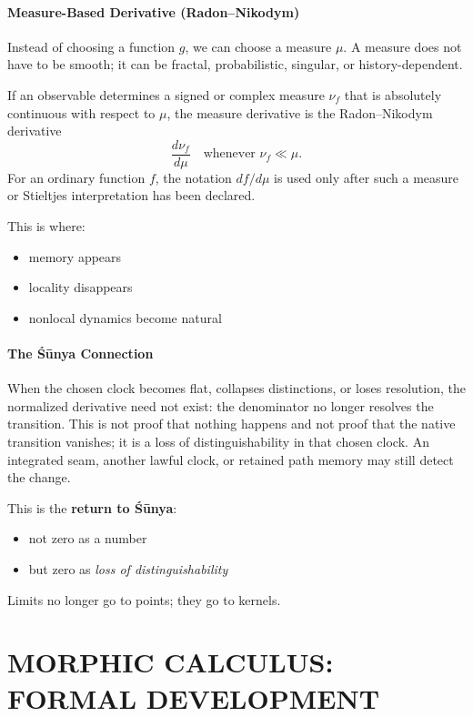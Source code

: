 \documentclass[12pt, oneside]{article}
\begin{document}
\subsection{Measure-Based Derivative (Radon--Nikodym)}

Instead of choosing a function $g$, we can choose a measure $\mu$. A measure does not have to be smooth; it can be fractal, probabilistic, singular, or history-dependent.

If an observable determines a signed or complex measure $\nu_f$ that is absolutely continuous with respect to $\mu$, the measure derivative is the Radon--Nikodym derivative
\begin{equation}
\frac{d\nu_f}{d\mu} \quad \text{whenever } \nu_f \ll \mu.
\end{equation}
For an ordinary function $f$, the notation $df/d\mu$ is used only after such a measure or Stieltjes interpretation has been declared.

This is where:
\begin{itemize}
    \item memory appears
    \item locality disappears
    \item nonlocal dynamics become natural
\end{itemize}

\subsection{The Śūnya Connection}

When the chosen clock becomes flat, collapses distinctions, or loses resolution, the normalized derivative need not exist: the denominator no longer resolves the transition. This is not proof that nothing happens and not proof that the native transition vanishes; it is a loss of distinguishability in that chosen clock. An integrated seam, another lawful clock, or retained path memory may still detect the change.

This is the \textbf{return to Śūnya}:
\begin{itemize}
    \item not zero as a number
    \item but zero as \emph{loss of distinguishability}
\end{itemize}
Limits no longer go to points; they go to kernels.

\newpage

\part{MORPHIC CALCULUS: FORMAL DEVELOPMENT}
\end{document}
